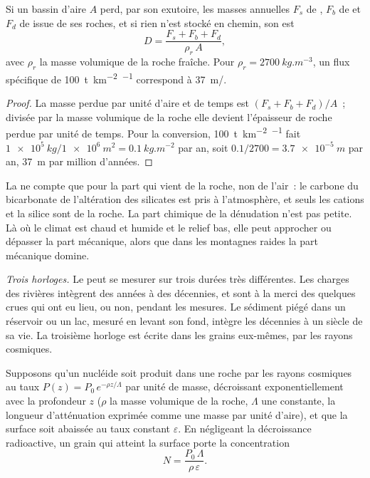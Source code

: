 \begin{proposition}\label{prop:b1:erosion-transport:denudation}
Si un bassin d'aire $A$ perd, par son exutoire, les masses annuelles $F_s$ de
, $F_b$ de  et $F_d$ de  issue de ses
roches, et si rien n'est stocké en chemin, son  est
\[
  D = \frac{F_s + F_b + F_d}{\rho_r\,A},
\]
avec $\rho_r$ la masse volumique de la roche fraîche. Pour $\rho_r =
\qty{2700}{kg.m^{-3}}$, un flux spécifique de \qty{100}{t.km^{-2}.\year^{-1}}
correspond à \qty{37}{m/\Ma}.
\end{proposition}

\begin{proof}
La masse perdue par unité d'aire et de temps est $(F_s + F_b + F_d)/A$~; divisée par la
masse volumique de la roche elle devient l'épaisseur de roche perdue par unité de temps. Pour
la conversion, \qty{100}{t.km^{-2}.\year^{-1}} fait
$\qty{1e5}{kg}/\qty{1e6}{m^2} = \qty{0.1}{kg.m^{-2}}$ par an, soit
$0.1/2700 = \qty{3.7e-5}{m}$ par an, \qty{37}{m} par million d'années.
\end{proof}

La  ne compte que pour la part qui vient de la roche, non de
l'air~: le carbone du bicarbonate de l'altération des silicates est pris à
l'atmosphère, et seuls les cations et la silice sont de la roche. La part chimique de
la dénudation n'est pas petite. Là où le climat est chaud et humide et le relief bas,
elle peut approcher ou dépasser la part mécanique, alors que dans les montagnes raides
la part mécanique domine.

\emph{Trois horloges.} Le  peut se mesurer sur trois durées très
différentes. Les charges des rivières intègrent des années à des décennies, et sont à
la merci des quelques crues qui ont eu lieu, ou non, pendant les
mesures. Le sédiment piégé dans un réservoir ou un lac, mesuré en levant
son fond, intègre les décennies à un siècle de sa vie. La
troisième horloge est écrite dans les grains eux-mêmes, par les rayons cosmiques.

\begin{proposition}\label{prop:b1:erosion-transport:cosmogenic}
Supposons qu'un nucléide soit produit dans une roche par les rayons cosmiques au taux
$P(z) = P_0\,e^{-\rho z/\Lambda}$ par unité de masse, décroissant exponentiellement avec
la profondeur $z$ ($\rho$ la masse volumique de la roche, $\Lambda$ une constante, la
longueur d'atténuation exprimée comme une masse par unité d'aire), et que la surface soit
abaissée au taux constant $\varepsilon$. En négligeant la décroissance radioactive, un grain
qui atteint la surface porte la concentration
\[
  N = \frac{P_0\,\Lambda}{\rho\,\varepsilon}.
\]
\end{proposition}


